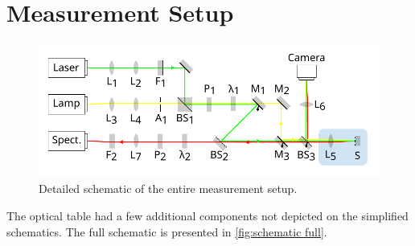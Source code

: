 \documentclass[
	twoside,
	parskip=half,
	a4paper,
]{scrbook}
\begin{document}
\section{Measurement Setup}
\begin{figure}
	\centering
	\includegraphics{../figures/setup.pdf}
	\caption{Detailed schematic of the entire measurement setup.}
	\label{fig:schematic full}
\end{figure}
The optical table had a few additional components not depicted on the simplified schematics.
The full schematic is presented in \autoref{fig:schematic full}.
\end{document}
